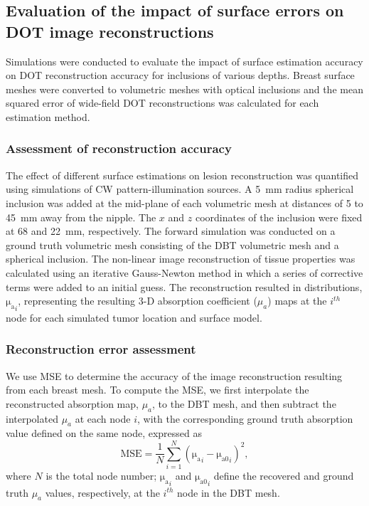\subsection{Evaluation of the impact of surface errors on DOT image reconstructions}
Simulations were conducted to evaluate the impact of surface estimation accuracy on \ac{DOT} reconstruction accuracy for inclusions of various depths. Breast surface meshes were converted to volumetric meshes with optical inclusions and the mean squared error of wide-field \ac{DOT} reconstructions was calculated for each estimation method. 

\subsubsection{Assessment of reconstruction accuracy}
The effect of different surface estimations on lesion reconstruction was quantified using simulations of \ac{CW} pattern-illumination sources. A 5~mm radius spherical inclusion was added at the mid-plane of each volumetric mesh at distances of 5 to 45~mm away from the nipple. The $x$ and $z$ coordinates of the inclusion were fixed at 68 and 22~mm, respectively. The forward simulation was conducted on a ground truth volumetric mesh consisting of the \ac{DBT} volumetric mesh and a spherical inclusion. The non-linear image reconstruction of tissue properties was calculated using an iterative Gauss-Newton method in which a series of corrective terms were added to an initial guess. The reconstruction resulted in distributions, $\mathrm{\mu_{a}}_{i}$, representing the resulting 3-D absorption coefficient ($\mu_a$) maps at the $i^{th}$ node for each simulated tumor location and surface model.

\subsubsection{Reconstruction error assessment}
We use \ac{MSE} to determine the accuracy of the image reconstruction resulting from each breast mesh. To compute the \ac{MSE}, we first interpolate the reconstructed absorption map, $\mu_a$, to the \ac{DBT} mesh, and then subtract the interpolated $\mu_a$ at each node $i$, with the corresponding ground truth absorption value defined on the same node, expressed as
\begin{equation}
\label{eq:mse}
\mathrm{MSE} = \frac{1}{N}\sum_{i=1}^{N}(\mathrm{\mu_{a}}_{i} - \mathrm{\mu_{a0}}_i)^{2},
\end{equation}
where $N$ is the total node number; $\mathrm{\mu_{a}}_i$ and $\mathrm{\mu_{a0}}_i$ define the recovered and ground truth $\mu_{a}$ values, respectively, at the $i^{th}$ node in the \ac{DBT} mesh.


